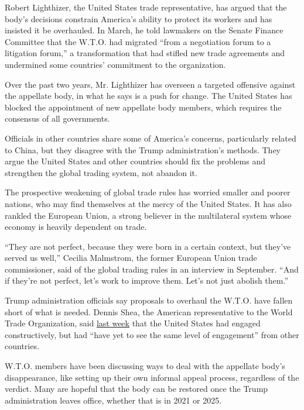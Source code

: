 Robert Lighthizer, the United States trade representative, has argued
that the body's decisions constrain America's ability to protect its
workers and has insisted it be overhauled. In March, he told lawmakers
on the Senate Finance Committee that the W.T.O. had migrated ``from a
negotiation forum to a litigation forum,'' a transformation that had
stifled new trade agreements and undermined some countries' commitment
to the organization.

Over the past two years, Mr. Lighthizer has overseen a targeted
offensive against the appellate body, in what he says is a push for
change. The United States has blocked the appointment of new appellate
body members, which requires the consensus of all governments.

Officials in other countries share some of America's concerns,
particularly related to China, but they disagree with the Trump
administration's methods. They argue the United States and other
countries should fix the problems and strengthen the global trading
system, not abandon it.

The prospective weakening of global trade rules has worried smaller and
poorer nations, who may find themselves at the mercy of the United
States. It has also rankled the European Union, a strong believer in the
multilateral system whose economy is heavily dependent on trade.

``They are not perfect, because they were born in a certain context, but
they've served us well,'' Cecilia Malmstrom, the former European Union
trade commissioner, said of the global trading rules in an interview in
September. ``And if they're not perfect, let's work to improve them.
Let's not just abolish them.''

Trump administration officials say proposals to overhaul the W.T.O. have
fallen short of what is needed. Dennis Shea, the American representative
to the World Trade Organization, said
\href{https://geneva.usmission.gov/2019/12/06/ambassador-sheas-statement-at-the-wto-trade-negotiating-committee-heads-of-delegation-meeting/}{last
week} that the United States had engaged constructively, but had ``have
yet to see the same level of engagement'' from other countries.

W.T.O. members have been discussing ways to deal with the appellate
body's disappearance, like setting up their own informal appeal process,
regardless of the verdict. Many are hopeful that the body can be
restored once the Trump administration leaves office, whether that is in
2021 or 2025.

